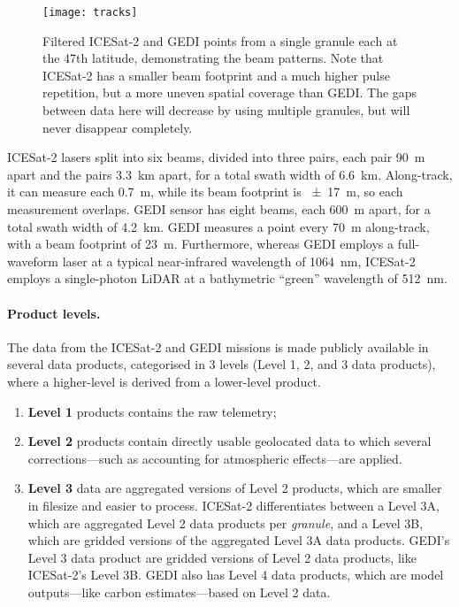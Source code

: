 %

\begin{figure}
  \centering
  \texttt{[image: tracks]}
  \caption{Filtered ICESat-2 and GEDI points from a single granule each at the 47th latitude, demonstrating the beam patterns.
    Note that ICESat-2 has a smaller beam footprint and a much higher pulse repetition, but a more uneven spatial coverage than GEDI\@.
    The gaps between data here will decrease by using multiple granules, but will never disappear completely.}%
  \label{fig:beams}
\end{figure}

ICESat-2 lasers split into six beams, divided into three pairs, each pair \qty{90}{m} apart and the pairs \qty{3.3}{km} apart, for a total swath width of \qty{6.6}{km}.
Along-track, it can measure each \qty{0.7}{m}, while its beam footprint is \qty{\pm17}{m}, so each measurement overlaps.
GEDI sensor has eight beams, each \qty{600}{m} apart, for a total swath width of \qty{4.2}{km}.
GEDI measures a point every \qty{70}{m} along-track, with a beam footprint of \qty{23}{m}.
Furthermore, whereas GEDI employs a full-waveform laser at a typical near-infrared wavelength of \qty{1064}{nm}, ICESat-2 employs a single-photon LiDAR at a bathymetric ``green'' wavelength of \qty{512}{nm}.
\paragraph{Product levels.}
The data from the ICESat-2 and GEDI missions is made publicly available in several data products, categorised in 3 levels (Level 1, 2, and 3 data products), where a higher-level is derived from a lower-level product.
\begin{enumerate}
  \item \textbf{Level 1} products contains the raw telemetry;
  \item \textbf{Level 2} products contain directly usable geolocated data to which several corrections---such as accounting for atmospheric effects---are applied.
  \item \textbf{Level 3} data are aggregated versions of Level 2 products, which are smaller in filesize and easier to process.
  ICESat-2 differentiates between a Level 3A, which are aggregated Level 2 data products per \emph{granule}, and a Level 3B, which are gridded versions of the aggregated Level 3A data products.
  GEDI's Level 3 data product are gridded versions of Level 2 data products, like ICESat-2's Level 3B.
  GEDI also has Level 4 data products, which are model outputs---like carbon estimates---based on Level 2 data.
\end{enumerate}


